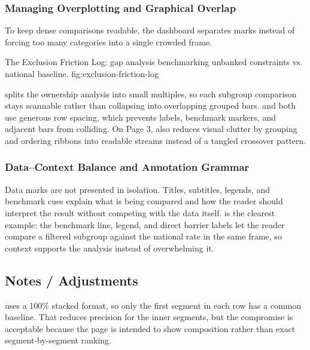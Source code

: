 \documentclass[../main.tex]{subfiles}
\begin{document}
\subsubsection{Managing Overplotting and Graphical Overlap}

To keep dense comparisons readable, the dashboard separates marks instead of
forcing too many categories into a single crowded frame.

{The Exclusion Friction Log: gap analysis benchmarking unbanked constraints vs. national baseline.}
{fig:exclusion-friction-log}

 splits the
ownership analysis into small multiples, so each subgroup comparison stays
scannable rather than collapsing into overlapping grouped bars.
 and
 both use generous
row spacing, which prevents labels, benchmark markers, and adjacent bars from
colliding. On Page 3, 
also reduces visual clutter by grouping and ordering ribbons into readable
streams instead of a tangled crossover pattern.

\subsubsection{Data--Context Balance and Annotation Grammar}

Data marks are not presented in isolation. Titles, subtitles, legends, and
benchmark cues explain what is being compared and how the reader should
interpret the result without competing with the data itself.
 is the clearest
example: the benchmark line, legend, and direct barrier labels let the reader
compare a filtered subgroup against the national rate in the same frame, so
context supports the analysis instead of overwhelming it.

\subsection{Notes / Adjustments}

 uses a 100\%
stacked format, so only the first segment in each row has a common baseline.
That reduces precision for the inner segments, but the compromise is
acceptable because the page is intended to show composition rather than exact
segment-by-segment ranking.
\end{document}
